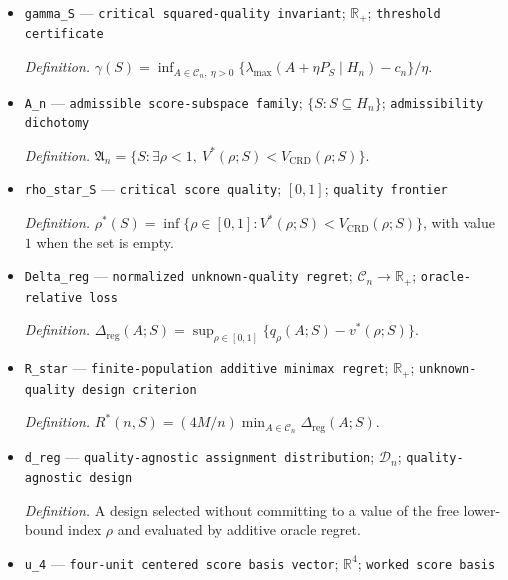 \documentclass{article}
\begin{document}
\begin{itemize}
  \par\smallskip\noindent\emph{Definition.} \(\kappa(S)=\min_{A\in\mathcal C_n}\lambda_{\max}(P_SAP_S\mid S)\).
  \item \texttt{gamma\_\allowbreak{}S} --- \texttt{critical squared-\allowbreak{}quality invariant}; \(\mathbb R_+\); \texttt{threshold certificate}
  \par\smallskip\noindent\emph{Definition.} \(\gamma(S)=\inf_{A\in\mathcal C_n,\ \eta>0}\{\lambda_{\max}(A+\eta P_S\mid H_n)-c_n\}/\eta\).
  \item \texttt{A\_\allowbreak{}n} --- \texttt{admissible score-\allowbreak{}subspace family}; \(\{S:S\subseteq H_n\}\); \texttt{admissibility dichotomy}
  \par\smallskip\noindent\emph{Definition.} \(\mathfrak A_n=\{S:\exists\rho<1,\ V^*(\rho;S)<V_{\mathrm{CRD}}(\rho;S)\}\).
  \item \texttt{rho\_\allowbreak{}star\_\allowbreak{}S} --- \texttt{critical score quality}; \([0,1]\); \texttt{quality frontier}
  \par\smallskip\noindent\emph{Definition.} \(\rho^*(S)=\inf\{\rho\in[0,1]:V^*(\rho;S)<V_{\mathrm{CRD}}(\rho;S)\}\), with value \(1\) when the set is empty.
  \item \texttt{Delta\_\allowbreak{}reg} --- \texttt{normalized unknown-\allowbreak{}quality regret}; \(\mathcal C_n\to\mathbb R_+\); \texttt{oracle-\allowbreak{}relative loss}
  \par\smallskip\noindent\emph{Definition.} \(\Delta_{\mathrm{reg}}(A;S)=\sup_{\rho\in[0,1]}\{q_\rho(A;S)-v^*(\rho;S)\}\).
  \item \texttt{R\_\allowbreak{}star} --- \texttt{finite-\allowbreak{}population additive minimax regret}; \(\mathbb R_+\); \texttt{unknown-\allowbreak{}quality design criterion}
  \par\smallskip\noindent\emph{Definition.} \(R^*(n,S)=(4M/n)\min_{A\in\mathcal C_n}\Delta_{\mathrm{reg}}(A;S)\).
  \item \texttt{d\_\allowbreak{}reg} --- \texttt{quality-\allowbreak{}agnostic assignment distribution}; \(\mathcal D_n\); \texttt{quality-\allowbreak{}agnostic design}
  \par\smallskip\noindent\emph{Definition.} A design selected without committing to a value of the free lower-bound index \(\rho\) and evaluated by additive oracle regret.
  \item \texttt{u\_\allowbreak{}4} --- \texttt{four-\allowbreak{}unit centered score basis vector}; \(\mathbb R^4\); \texttt{worked score basis}

\end{itemize}
\end{document}
